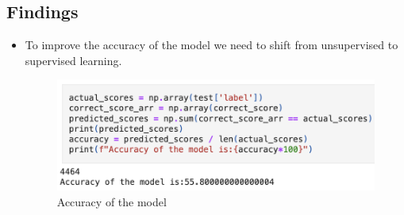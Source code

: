 \documentclass{article}
\begin{document}
\subsection{Findings}
\begin{itemize}
    \item To improve the accuracy of the model we need to shift from unsupervised to supervised learning.
    \begin{figure}[ht]
        \centering
        \includegraphics[width=1\linewidth]{accuracy.png}
        \caption{Accuracy of the model}
        \label{fig:enter-label}
\end{figure}
\end{itemize}
\end{document}
